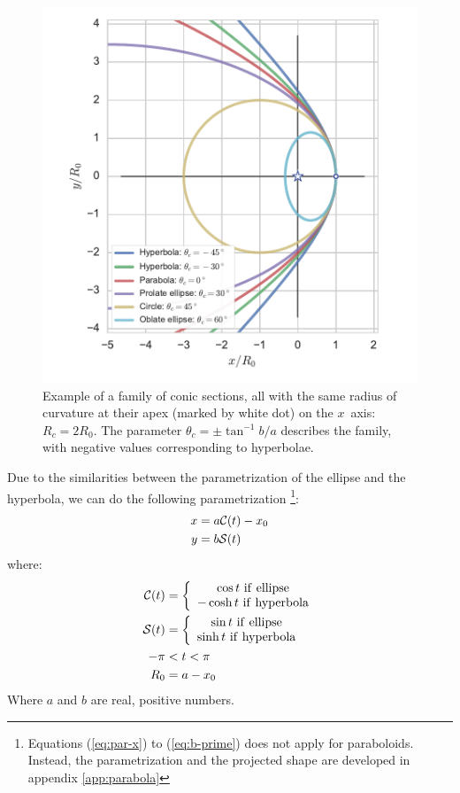 \begin{figure}
\includegraphics[width=\linewidth]{conic1}
\caption{Example of a family of conic sections, all with the same
  radius of curvature at their apex (marked by white dot) on the
  \(x\)~axis: \(R_c = 2 R_0\). The parameter
  $\theta_c = \pm \tan^{-1} b/a$ describes the family, with negative
  values corresponding to hyperbolae.}
\label{fig:conics-family}
\end{figure}

Due to the similarities between the parametrization of the ellipse and the hyperbola, we can do the following parametrization
\footnote{Equations (\ref{eq:par-x}) to (\ref{eq:b-prime}) does not apply for paraboloids. Instead, the parametrization and the
  projected shape are developed in appendix \ref{app:parabola}}:
\begin{align}
x &= a\mathcal{C}(t)-x_0 \label{eq:par-x}\\ 
y &= b\mathcal{S}(t) \label{eq:par-y}
\end{align}
where:
\begin{align}
\mathcal{C}(t) &= \left\lbrace \begin{array}{c}
\cos t ~\mathrm{if~ellipse} \\
-\cosh t ~\mathrm{if~hyperbola}
\end{array}\right.\\
\mathcal{S}(t) &= \left\lbrace \begin{array}{c}
\sin t ~\mathrm{if~ellipse} \\
\sinh t ~\mathrm{if~hyperbola}
\end{array}\right. \\
-\pi &< t < \pi \\
R_0 &= a - x_0 \\
\end{align}
Where $a$ and $b$ are real, positive numbers.


